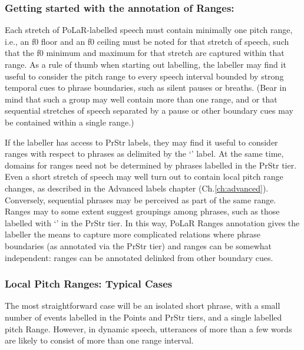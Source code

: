 \documentclass[11pt, twoside]{memoir}
\def\polar#1{{\relsize{-.5}\fontspec[Mapping=tex-text]{Roboto Mono}{#1}}}
\def\polarquot#1{‘\polar{#1}’}
\begin{document}
\subsubsection{Getting started with the annotation of Ranges:}\label{sec:getting-started-with-the-annotation-of-ranges}

Each stretch of PoLaR-labelled speech must contain minimally one pitch range, i.e., an f0 floor and an f0 ceiling must be noted for that stretch of speech, such that the f0 minimum and maximum for that stretch are captured within that range. As a rule of thumb when starting out labelling, the labeller may find it useful to consider the pitch range to every speech interval bounded by strong temporal cues to phrase boundaries, such as silent pauses or breaths. (Bear in mind that such a group may well contain more than one range, and or that sequential stretches of speech separated by a pause or other boundary cues may be contained within a single range.)

If the labeller has access to PrStr labels, they may find it useful to consider ranges with respect to phrases as delimited by the \polarquot{]} label. At the same time, domains for ranges need not be determined by phrases labelled in the PrStr tier. Even a short stretch of speech may well turn out to contain local pitch range changes, as described in the Advanced labels chapter (Ch.\ref{ch:advanced}). Conversely, sequential phrases may be perceived as part of the same range. Ranges may to some extent suggest groupings among phrases, such as those labelled with \polarquot{]} in the PrStr tier. In this way, PoLaR Ranges annotation gives the labeller the means to capture more complicated relations where phrase boundaries (as annotated via the PrStr tier) and ranges can be somewhat independent: ranges can be annotated delinked from other boundary cues.

\subsubsection{Local Pitch Ranges: Typical Cases}\label{sec:local-pitch-ranges-typical-cases}

The most straightforward case will be an isolated short phrase, with a small number of events labelled in the Points and PrStr tiers, and a single labelled pitch Range. However, in dynamic speech, utterances of more than a few words are likely to consist of more than one range interval.
\end{document}
